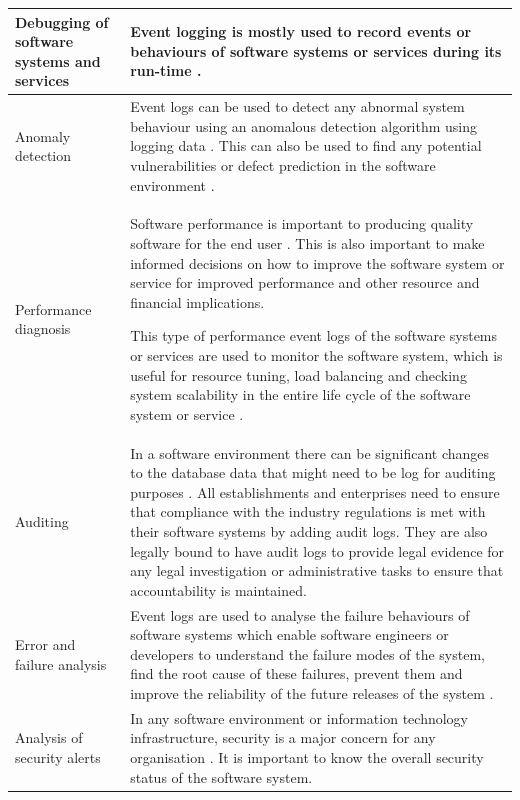 \begin{xltabular}{\textwidth}{|l|X|}
		\hline Debugging of software systems and services & Event logging is mostly used to record events or behaviours of software systems or services during its run-time \cite{Rong2018a}.\\
		\hline Anomaly detection & Event logs can be used to detect any abnormal system behaviour using an anomalous detection algorithm using logging data \cite{Gurumdimma2016}. This can also be used to find any potential vulnerabilities or defect prediction in the software environment \cite{Dwyer2013}. \\
		\hline Performance diagnosis & Software performance is important to producing quality software for the end user \cite{EvangelinGeetha2007, Baccanico2014}. This is also important to make informed decisions on how to improve the software system or service for improved performance and other resource and financial implications.\par This type of performance event logs of the software systems or services are used to monitor the software system, which is useful for resource tuning, load balancing and checking system scalability in the entire life cycle of the software system or service \cite{Song2017}. \\ 
		\hline Auditing & In a software environment there can be significant changes to the database data that might need to be log for auditing purposes \cite{Rong2018a}. All establishments and enterprises need to ensure that compliance with the industry regulations is met with their software systems by adding audit logs. They are also legally bound to have audit logs to provide legal evidence for any legal investigation or administrative tasks to ensure that accountability is maintained. \\
		\hline Error and failure analysis & Event logs are used to analyse the failure behaviours of software systems which enable software engineers or developers to understand the failure modes of the system, find the root cause of these failures, prevent them and improve the reliability of the future releases of the system \cite{Cinque2013}.\\
		\hline Analysis of security alerts & In any software environment or information technology infrastructure, security is a major concern for any organisation \cite{Pathan2014, Dwyer2013}. It is important to know the overall security status of the software system. \\
\end{xltabular}

